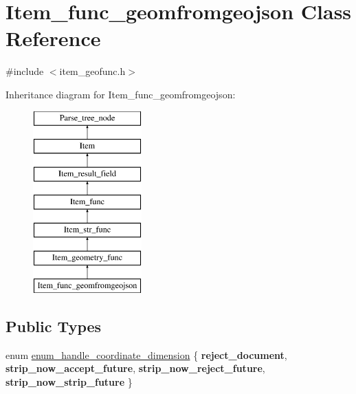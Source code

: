 \hypertarget{classItem__func__geomfromgeojson}{}\section{Item\+\_\+func\+\_\+geomfromgeojson Class Reference}
\label{classItem__func__geomfromgeojson}


{\ttfamily \#include $<$item\+\_\+geofunc.\+h$>$}

Inheritance diagram for Item\+\_\+func\+\_\+geomfromgeojson\+:\begin{figure}[H]
\begin{center}
\leavevmode
\includegraphics[height=7.000000cm]{classItem__func__geomfromgeojson}
\end{center}
\end{figure}
\subsection*{Public Types}
\begin{DoxyCompactItemize}
\item 
enum \mbox{\hyperlink{classItem__func__geomfromgeojson_af387fb89b59818974b00c81624079245}{enum\+\_\+handle\+\_\+coordinate\+\_\+dimension}} \{ {\bfseries reject\+\_\+document}, 
{\bfseries strip\+\_\+now\+\_\+accept\+\_\+future}, 
{\bfseries strip\+\_\+now\+\_\+reject\+\_\+future}, 
{\bfseries strip\+\_\+now\+\_\+strip\+\_\+future}
 \}
\end{DoxyCompactItemize}
